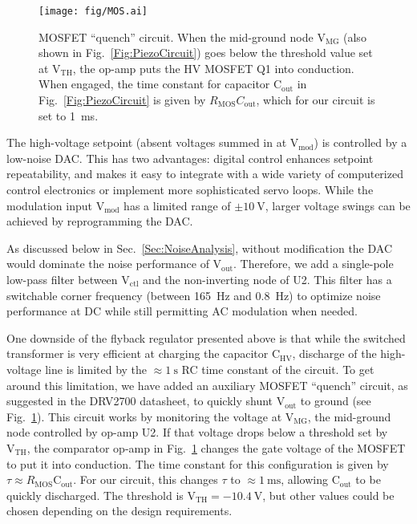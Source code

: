 \documentclass[aip,rsi,reprint]{revtex4-1} %
\begin{document}
\begin{figure}[t!]
\texttt{[image: fig/MOS.ai]}
\caption{MOSFET ``quench'' circuit.
When the mid-ground node $\text{V}_\text{MG}$ (also shown in Fig.~\ref{Fig:PiezoCircuit}) goes below the threshold value set at $\text{V}_\text{TH}$, the op-amp puts the HV MOSFET Q1 into conduction.
When engaged, the time constant for capacitor $\text{C}_\text{out}$ in Fig.~\ref{Fig:PiezoCircuit} is given by $R_\text{MOS} C_\text{out}$, which for our circuit is set to \SI{1}{\milli\second}.
\label{Fig:MOS}}
\end{figure}

The high-voltage setpoint (absent voltages summed in at $\text{V}_\text{mod}$) is controlled by a low-noise DAC.
This has two advantages: digital control enhances setpoint repeatability, and makes it easy to integrate with a wide variety of computerized control electronics or implement more sophisticated servo loops.
While the modulation input $\text{V}_\text{mod}$ has a limited range of $\pm\SI{10}{\volt}$, larger voltage swings can be achieved by reprogramming the DAC.

As discussed below in Sec.~\ref{Sec:NoiseAnalysis}, without modification the DAC would dominate the noise performance of $\text{V}_\text{out}$.
Therefore, we add a single-pole low-pass filter between $\text{V}_\text{ctl}$ and the non-inverting node of U2.
This filter has a switchable corner frequency (between \SI{165}{\hertz} and \SI{0.8}{\hertz}) to optimize noise performance at DC while still permitting AC modulation when needed.

One downside of the flyback regulator presented above is that while the switched transformer is very efficient at charging the capacitor $\text{C}_\text{HV}$, discharge of the high-voltage line is limited by the $\approx\SI{1}{\second}$ RC time constant of the circuit.
To get around this limitation, we have added an auxiliary MOSFET ``quench'' circuit, as suggested in the DRV2700 datasheet, to quickly shunt $\text{V}_\text{out}$ to ground (see Fig.~\ref{Fig:MOS}).
This circuit works by monitoring the voltage at $\text{V}_\text{MG}$, the mid-ground node controlled by op-amp U2.
If that voltage drops below a threshold set by $\text{V}_\text{TH}$, the comparator op-amp in Fig.~\ref{Fig:MOS} changes the gate voltage of the MOSFET to put it into conduction.
The time constant for this configuration is given by $\tau \approx R_\text{MOS}\text{C}_\text{out}$. For our circuit, this changes $\tau$ to $\approx\SI{1}{\milli\second}$, allowing $\text{C}_\text{out}$ to be quickly discharged.
The threshold is $\text{V}_\text{TH} = \SI{-10.4}{\volt}$, but other values could be chosen depending on the design requirements.
\end{document}
